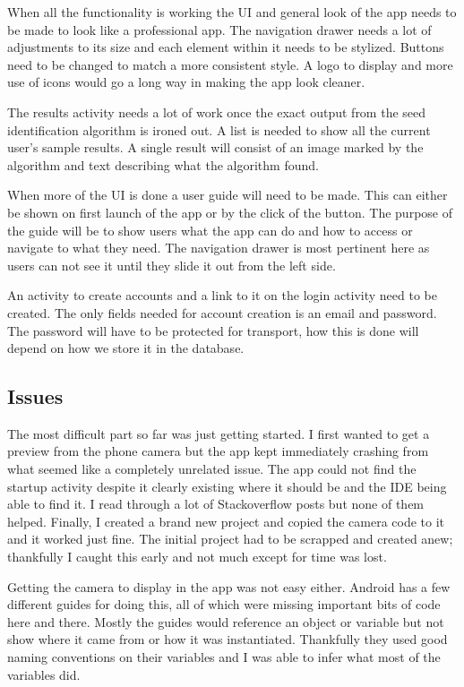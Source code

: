 \documentclass[onecolumn, draftclsnofoot,10pt, compsoc]{IEEEtran}
\begin{document}
		When all the functionality is working the UI and general look of the app needs to be made to look like a professional app.
		The navigation drawer needs a lot of adjustments to its size and each element within it needs to be stylized.
		Buttons need to be changed to match a more consistent style.
		A logo to display and more use of icons would go a long way in making the app look cleaner.

		The results activity needs a lot of work once the exact output from the seed identification algorithm is ironed out.
		A list is needed to show all the current user's sample results.
		A single result will consist of an image marked by the algorithm and text describing what the algorithm found.

		When more of the UI is done a user guide will need to be made.
		This can either be shown on first launch of the app or by the click of the button.
		The purpose of the guide will be to show users what the app can do and how to access or navigate to what they need.
		The navigation drawer is most pertinent here as users can not see it until they slide it out from the left side.

		An activity to create accounts and a link to it on the login activity need to be created.
		The only fields needed for account creation is an email and password.
		The password will have to be protected for transport, how this is done will depend on how we store it in the database.

	\subsection{Issues}
		The most difficult part so far was just getting started.
		I first wanted to get a preview from the phone camera but the app kept immediately crashing from what seemed like a completely unrelated issue.
		The app could not find the startup activity despite it clearly existing where it should be and the IDE being able to find it.
		I read through a lot of Stackoverflow posts but none of them helped.
		Finally, I created a brand new project and copied the camera code to it and it worked just fine.
		The initial project had to be scrapped and created anew; thankfully I caught this early and not much except for time was lost.
		
		Getting the camera to display in the app was not easy either.
		Android has a few different guides for doing this, all of which were missing important bits of code here and there.
		Mostly the guides would reference an object or variable but not show where it came from or how it was instantiated.
		Thankfully they used good naming conventions on their variables and I was able to infer what most of the variables did.
\end{document}
